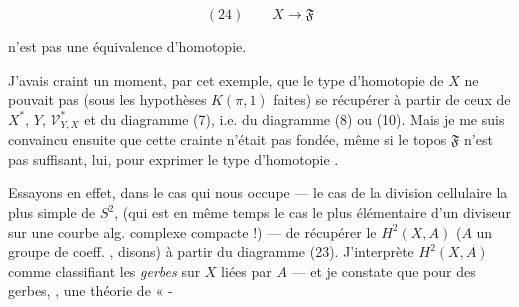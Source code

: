 \documentclass[11pt,a4paper]{article}
\begin{document}
\[
  (24) \qquad X \longrightarrow \mathfrak{F}
\]

n'est pas une équivalence d'homotopie.


J'avais craint un moment, par cet exemple, que le type 
d'homotopie de $X$ ne pouvait pas (sous les hypothèses $K(\pi,1)$ faites) se
récupérer à partir de ceux de $X^{*}$, $Y$, $\mathcal{V}^{*}_{Y,X}$ et du
diagramme (7), i.e. du diagramme (8) ou (10). Mais je me suis convaincu ensuite
que cette crainte n'était pas fondée, même si le topos $\mathfrak{F}$ n'est pas
suffisant, lui, pour exprimer le type d'homotopie .

Essayons en effet, dans le cas qui nous occupe — le cas de la division
cellulaire la plus simple de $S^2$, (qui est en même temps le cas le plus
 élémentaire d'un diviseur sur une courbe alg.
complexe compacte !) — de récupérer le $H^2(X, A)$ ($A$ un groupe de coeff. ,
disons) à partir du diagramme (23). J'interprète $H^2(X,A)$ comme classifiant
les \emph{gerbes} sur $X$ liées par $A$ — et je constate que pour des
 gerbes, ,  une théorie de « -

\end{document}
